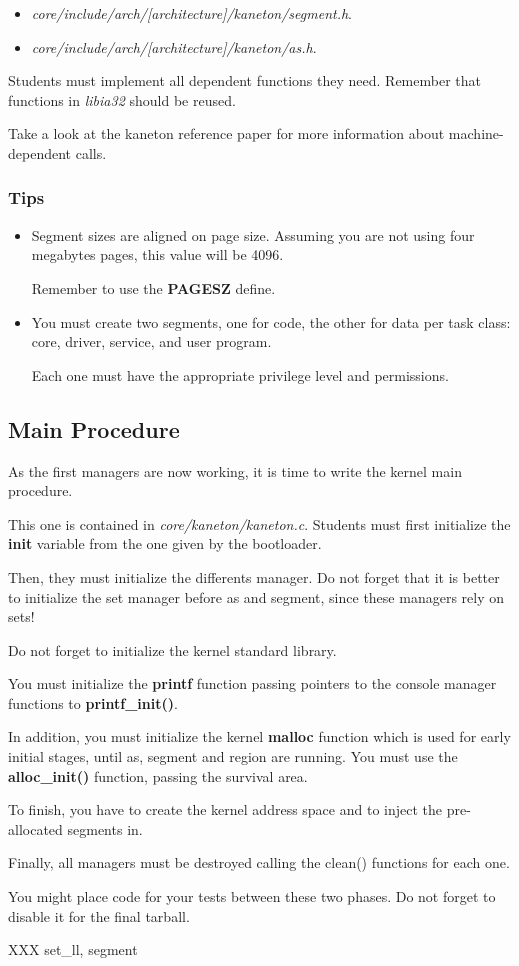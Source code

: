 \begin{itemize}
  \item
    \textit{core/include/arch/[architecture]/kaneton/segment.h}.
  \item
    \textit{core/include/arch/[architecture]/kaneton/as.h}.
\end{itemize}

Students must implement all dependent functions they need. Remember that
functions in \textit{libia32} should be reused.

Take a look at the kaneton reference paper for more information about
machine-dependent calls.

\subsubsection{Tips}

\begin{itemize}
  \item
    Segment sizes are aligned on page size. Assuming you are not using
    four megabytes pages, this value will be 4096.

    Remember to use the \textbf{PAGESZ} define.
  \item
    You must create two segments, one for code, the other for data
    per task class: core, driver, service, and user program.

    Each one must have the appropriate privilege level and permissions.
\end{itemize}

%
%

\subsection{Main Procedure}

As the first managers are now working, it is time to write the kernel
main procedure.

This  one is  contained in \textit{core/kaneton/kaneton.c}. Students
must first initialize the \textbf{init} variable from the one given by
the bootloader.

Then, they  must initialize the differents manager. Do not forget that
it is better to initialize the set manager before as and segment,
since these managers rely on sets!

Do not forget to initialize the kernel standard library.

You must initialize the \textbf{printf} function passing pointers to the
console manager functions to \textbf{printf\_init()}.

In addition, you must initialize the kernel \textbf{malloc} function which
is used for early initial stages, until as, segment and region are running.
You must use the \textbf{alloc\_init()} function, passing the survival area.

To finish, you  have to create the kernel address space and to inject
the pre-allocated segments in.

Finally, all managers must be destroyed calling the clean() functions for
each one.

You might place code for your tests between these two phases. Do not
forget to disable it for the final tarball.

XXX set\_ll, segment
